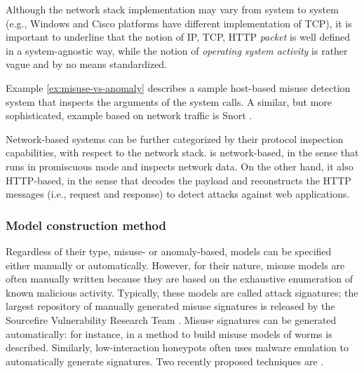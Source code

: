 \begin{note}\label{note:network-stack-standardized}
  Although the network stack implementation may vary from system to
  system (e.g., \textsf{Windows} and \textsf{Cisco} platforms have
  different implementation of \ac{TCP}), it is important to underline
  that the notion of IP, TCP, HTTP \emph{packet} is well defined in a
  system-agnostic way, while the notion of \emph{operating system
    activity} is rather vague and by no means standardized.
\end{note}

Example \ref{ex:misuse-vs-anomaly} describes a sample host-based
misuse detection system that inspects the arguments of the system
calls. A similar, but more sophisticated, example based on network
traffic is \textsf{Snort} \citep{snortlisa,snortsite}.

\begin{note}
  Network-based systems can be further categorized by their protocol
  inspection capabilities, with respect to the network
  stack. \webanomaly \citep{kruegel:jcn2005:webanomaly,webanomalysite}
  is network\hyp{}based, in the sense that runs in promiscuous mode
  and inspects network data. On the other hand, it also
  \ac{HTTP}-based, in the sense that decodes the payload
  and reconstructs the \ac{HTTP} messages (i.e., request
  and response) to detect attacks against web applications.
\end{note}

\subsubsection{Model construction method} Regardless of their type,
misuse- or anomaly-based, models can be specified either manually or
automatically. However, for their nature, misuse models are often
manually written because they are based on the exhaustive enumeration
of known malicious activity. Typically, these models are called attack
signatures; the largest repository of manually generated misuse
signatures is released by the \textsf{Sourcefire Vulnerability
Research Team\texttrademark} \citep{snortrules}. Misuse signatures can
be generated automatically: for instance, in \citep{1251258} a method
to build misuse models of worms is described. Similarly,
low-interaction honeypots often uses malware emulation to
automatically generate signatures. Two recently proposed techniques
are \citep{argos:eurosys06,1224380}.

